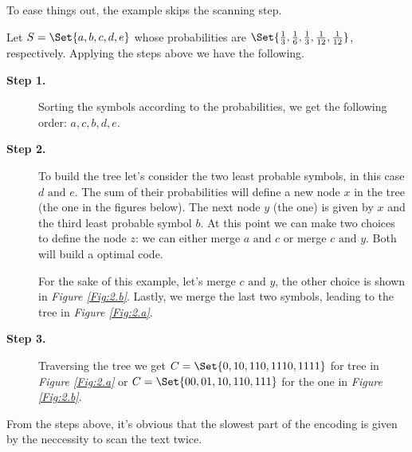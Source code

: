 \documentclass{subfiles}
\begin{document}
        \begin{example*}
            To ease things out, the example skips the scanning step.

            Let \(S = \Set{a, b, c, d, e}\) whose probabilities are
            \(\Set{\tfrac{1}{3}, \tfrac{1}{6}, \tfrac{1}{3},
            \tfrac{1}{12}, \tfrac{1}{12}}\), respectively. 
            Applying the steps above we have the following.
            \begin{description}
                \item [\textbf{Step 1.}] 
                    Sorting the symbols according to the probabilities,
                    we get the following order: \(a, c, b, d, e\).

                \item [\textbf{Step 2.}] 
                    To build the tree let's consider the 
                    two least probable symbols, in this case \(d \text{ and } e\).
                    The sum of their probabilities will define a new node \(x\) in the
                    tree (the  one in the figures below).
                    The next node \(y\) (the  one) is given by \(x\) 
                    and the third least probable symbol \(b\).
                    At this point we can make two choices to define the node \(z\):
                    we can either merge \(a \text{ and } c\) or merge \(c \text{ and } y\).
                    Both will build a optimal code. 
                    
                    For the sake of this example, let's merge \(c \text{ and } y\),
                    the other choice is shown in \emph{Figure \ref{Fig:2.b}}.
                    Lastly, we merge the last two symbols, 
                    leading to the tree in \emph{Figure \ref{Fig:2.a}}.
                    

                \item [\textbf{Step 3.}] Traversing the tree we get 
                    \(C = \Set{0, 10, 110, 1110, 1111}\) for tree in 
                    \emph{Figure \ref{Fig:2.a}} or \(C = \Set{00, 01, 10, 110, 111}\)
                    for the one in \emph{Figure \ref{Fig:2.b}}.
            \end{description}   
        \end{example*}

        From the steps above, it's obvious that the slowest part of the encoding
        is given by the neccessity to scan the text twice. 
\end{document}

